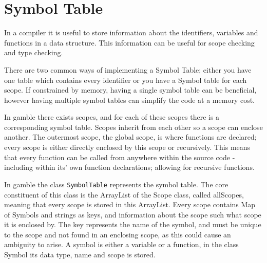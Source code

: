 \section{Symbol Table}
In a compiler it is useful to store information about the identifiers, variables and functions in a data structure. 
This information can be useful for scope checking and type checking.

There are two common ways of implementing a Symbol Table; either you have one table which contains every identifier or you have a Symbol table for each scope. 
If constrained by memory, having a single symbol table can be beneficial, however having multiple symbol tables can simplify the code at a memory cost. 

In \gls{gamble} there exists scopes, and for each of these scopes there is a corresponding symbol table. 
Scopes inherit from each other so a scope can enclose another. 
The outermost scope, the global scope, is where functions are declared; every scope is either directly enclosed by this scope or recursively.
This means that every function can be called from anywhere within the source code - including within its' own function declarations; allowing for recursive functions. 
  

In \gls{gamble} the class \texttt{SymbolTable} represents the symbol table.
The core constituent of this class is the ArrayList of the Scope class, called allScopes, meaning that every scope is stored in this ArrayList.
Every scope contains Map of Symbols and strings as keys, and information about the scope such what scope it is enclosed by. 
The key represents the name of the symbol, and must be unique to the scope and not found in an enclosing scope, as this could cause an ambiguity to arise. 
A symbol is either a variable or a function, in the class Symbol its data type, name and scope is stored. 
